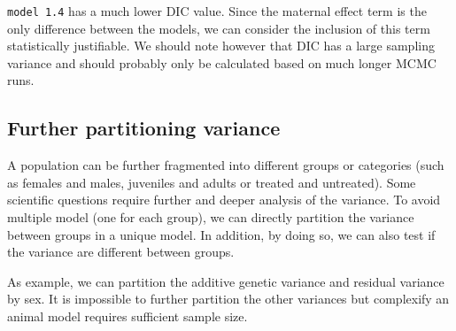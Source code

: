 \documentclass[
  12pt,
]{book}
\begin{document}
\texttt{model\ 1.4} has a much lower DIC value. Since the maternal effect term is the only difference between the models, we can consider the inclusion of this term statistically justifiable. We should note however that DIC has a large sampling variance and should probably only be calculated based on much longer MCMC runs.

\hypertarget{further-partitioning-variance}{%
\subsection{Further partitioning variance}\label{further-partitioning-variance}}

A population can be further fragmented into different groups or categories (such as females and males, juveniles and adults or treated and untreated). Some scientific questions require further and deeper analysis of the variance.
To avoid multiple model (one for each group), we can directly partition the variance between groups in a unique model. In addition, by doing so, we can also test if the variance are different between groups.

As example, we can partition the additive genetic variance and residual variance by sex. It is impossible to further partition the other variances but complexify an animal model requires sufficient sample size.
\end{document}
